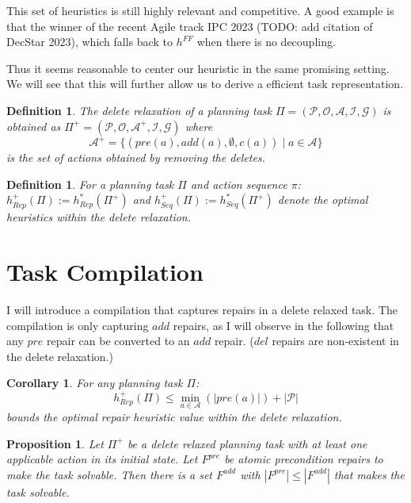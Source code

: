 \documentclass[twocolumn]{article}
\newcommand{\task}{\ensuremath{\Pi}\xspace}
\newcommand{\preds}{\ensuremath{\mathcal{P}}\xspace}
\newcommand{\acts}{\ensuremath{\mathcal{A}}\xspace}
\newcommand{\objects}{\ensuremath{\mathcal{O}}\xspace}
\newcommand{\init}{\ensuremath{\mathcal{I}}\xspace}
\newcommand{\goal}{\ensuremath{\mathcal{G}}\xspace}
\newcommand{\prename}{\ensuremath{pre}\xspace}
\newcommand{\addname}{\ensuremath{add}\xspace}
\newcommand{\delname}{\ensuremath{del}\xspace}
\newcommand{\pre}[1]{\ensuremath{\prename(#1)}\xspace}
\newcommand{\add}[1]{\ensuremath{\addname(#1)}\xspace}
\newcommand{\arity}[1]{\ensuremath{|#1|}}
\newcommand{\cost}[1]{\ensuremath{c(#1)}\xspace}
\newcommand{\fixPre}{\ensuremath{F^{\prename}}\xspace}
\newcommand{\fixAdd}{\ensuremath{F^{\addname}}\xspace}
\newcommand{\someAct}{\ensuremath{a}\xspace}
\newcommand{\someActSeq}{\ensuremath{\pi}\xspace}
\newcommand{\optimalHeuristic}{\ensuremath{h^{*}_{Rep}}\xspace}
\newcommand{\optimalHeuristicSeq}{\ensuremath{h^{*}_{Seq}}\xspace}
\newcommand{\optimalHeuristicRel}{\ensuremath{h^{+}_{Rep}}\xspace}
\newcommand{\optimalHeuristicSeqRel}{\ensuremath{h^{+}_{Seq}}\xspace}
\newcommand{\relaxedActs}{\ensuremath{\acts^{+}}\xspace}
\newcommand{\relaxedTask}{\ensuremath{\task^{+}}\xspace}
\newtheorem{proposition}[theorem]{Proposition}
\newtheorem{corollary}[theorem]{Corollary}
\newtheorem{definition}[theorem]{Definition}
\begin{document}
	This set of heuristics is still highly relevant and competitive.
	A good example is that the winner of the recent Agile track IPC 2023 (TODO: add citation of DecStar 2023), which falls back to $h^{FF}$ when there is no decoupling.
	
	Thus it seems reasonable to center our heuristic in the same promising setting.
	We will see that this will further allow us to derive a efficient task representation.
	
	
	
	\begin{definition}
		The delete relaxation of a planning task
		$\task = (\preds, \objects, \acts, \init, \goal)$
		is obtained as
		$\relaxedTask = (\preds, \objects, \relaxedActs, \init, \goal)$
		where 
		$$
		\relaxedActs = \{
		(\pre{\someAct}, \add{\someAct}, \emptyset, \cost{\someAct}) \mid \someAct \in \acts
		\}
		$$
		is the set of actions obtained by removing the deletes.
	\end{definition}
	
	\begin{definition}
		For a planning task \task and action sequence \someActSeq:
		$\optimalHeuristicRel(\task) := \optimalHeuristic(\relaxedTask)$
		and 
		$\optimalHeuristicSeqRel(\task) := \optimalHeuristicSeq(\relaxedTask)$
		denote the optimal heuristics within the delete relaxation.
	\end{definition}
	
	
	\section{Task Compilation}
	
	I will introduce a compilation that captures repairs in a delete relaxed task.
	The compilation is only capturing \addname repairs, as I will observe in the following that any \prename repair can be converted to an \addname repair.
	(\delname repairs are non-existent in the delete relaxation.)
	
	\begin{corollary}
		For any planning task \task:
		$$\optimalHeuristicRel(\task) \leq \min_{\someAct \in \acts}(\arity{\pre{\someAct}}) + \arity{\preds}$$
		bounds the optimal repair heuristic value within the delete relaxation.
	\end{corollary}
	
	\begin{proposition}
		Let \relaxedTask be a delete relaxed planning task with at least one applicable action in its initial state.
		Let \fixPre be atomic precondition repairs to make the task solvable.
		Then there is a set \fixAdd with $\arity{\fixPre} \leq \arity{\fixAdd}$ that makes the task solvable.
	\end{proposition}
	
\end{document}
